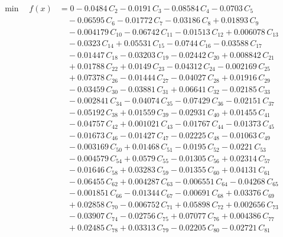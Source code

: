 \documentclass[a4paper,11pt]{article}
\begin{document}
\begin{align}
\min\quad f(x) &= 0 - 0.0484\,C_{2} - 0.0191\,C_{3} - 0.08584\,C_{4} - 0.0703\,C_{5} \nonumber\\
&\quad - 0.06595\,C_{6} - 0.01772\,C_{7} - 0.03186\,C_{8} + 0.01893\,C_{9} \nonumber\\
&\quad - 0.004179\,C_{10} - 0.06742\,C_{11} - 0.01513\,C_{12} + 0.006078\,C_{13} \nonumber\\
&\quad - 0.0323\,C_{14} + 0.05531\,C_{15} - 0.0744\,C_{16} - 0.03588\,C_{17} \nonumber\\
&\quad - 0.01447\,C_{18} - 0.03203\,C_{19} - 0.02442\,C_{20} + 0.008842\,C_{21} \nonumber\\
&\quad + 0.01788\,C_{22} + 0.0149\,C_{23} - 0.04312\,C_{24} - 0.002169\,C_{25} \nonumber\\
&\quad + 0.07378\,C_{26} - 0.01444\,C_{27} - 0.04027\,C_{28} + 0.01916\,C_{29} \nonumber\\
&\quad - 0.03459\,C_{30} - 0.03881\,C_{31} + 0.06641\,C_{32} - 0.02185\,C_{33} \nonumber\\
&\quad - 0.002841\,C_{34} - 0.04074\,C_{35} - 0.07429\,C_{36} - 0.02151\,C_{37} \nonumber\\
&\quad - 0.05192\,C_{38} + 0.01559\,C_{39} - 0.02931\,C_{40} + 0.01455\,C_{41} \nonumber\\
&\quad - 0.04757\,C_{42} + 0.001021\,C_{43} - 0.01767\,C_{44} - 0.01373\,C_{45} \nonumber\\
&\quad - 0.01673\,C_{46} - 0.01427\,C_{47} - 0.02225\,C_{48} - 0.01063\,C_{49} \nonumber\\
&\quad - 0.003169\,C_{50} + 0.01468\,C_{51} - 0.0195\,C_{52} - 0.0221\,C_{53} \nonumber\\
&\quad - 0.004579\,C_{54} + 0.0579\,C_{55} - 0.01305\,C_{56} + 0.02314\,C_{57} \nonumber\\
&\quad - 0.01646\,C_{58} + 0.03283\,C_{59} - 0.01355\,C_{60} + 0.04131\,C_{61} \nonumber\\
&\quad - 0.06455\,C_{62} + 0.004287\,C_{63} - 0.006551\,C_{64} - 0.04268\,C_{65} \nonumber\\
&\quad - 0.001851\,C_{66} - 0.01344\,C_{67} - 0.00691\,C_{68} + 0.03376\,C_{69} \nonumber\\
&\quad + 0.02858\,C_{70} - 0.006752\,C_{71} + 0.05898\,C_{72} + 0.002656\,C_{73} \nonumber\\
&\quad - 0.03907\,C_{74} - 0.02756\,C_{75} + 0.07077\,C_{76} + 0.004386\,C_{77} \nonumber\\
&\quad + 0.02485\,C_{78} + 0.03313\,C_{79} - 0.02205\,C_{80} - 0.02721\,C_{81} \nonumber\\

\end{align}
\end{document}
